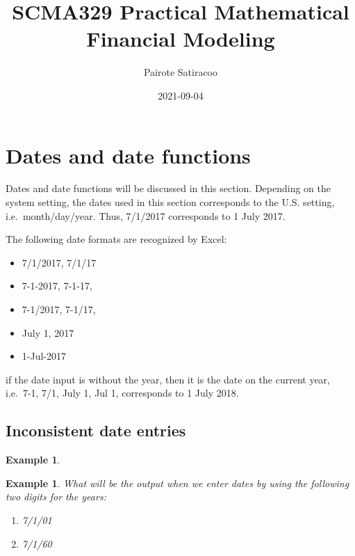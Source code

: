 \documentclass[
]{article}
\title{SCMA329 Practical Mathematical Financial Modeling}
\author{Pairote Satiracoo}
\date{2021-09-04}
\theoremstyle{definition}
\theoremstyle{definition}
\newtheorem{example}{Example}[section]
\theoremstyle{definition}
\theoremstyle{definition}
\theoremstyle{remark}
\begin{document}
\maketitle

{
\setcounter{tocdepth}{2}
\tableofcontents
}
\hypertarget{dates-and-date-functions}{%
\section{Dates and date functions}\label{dates-and-date-functions}}

Dates and date functions will be discussed in this section. Depending on
the system setting, the dates used in this section corresponds to the
U.S. setting, i.e.~month/day/year. Thus, 7/1/2017 corresponds to 1 July
2017.

The following date formats are recognized by Excel:

\begin{itemize}
\item
  7/1/2017, 7/1/17
\item
  7-1-2017, 7-1-17,
\item
  7-1/2017, 7-1/17,
\item
  July 1, 2017
\item
  1-Jul-2017
\end{itemize}

if the date input is without the year, then it is the date on the
current year, i.e.~7-1, 7/1, July 1, Jul 1, corresponds to 1 July 2018.

\hypertarget{inconsistent-date-entries}{%
\subsection{Inconsistent date entries}\label{inconsistent-date-entries}}

\begin{example}
\protect\hypertarget{exm:unlabeled-div-1}{}\label{exm:unlabeled-div-1}

\textbf{Example 1}. \emph{What will be the output when we enter dates by using the
following two digits for the years:}

\begin{enumerate}
\def\labelenumi{\arabic{enumi}.}
\item
  \emph{7/1/01}
\item
  \emph{7/1/60}
\end{enumerate}

\end{example}
\end{document}
